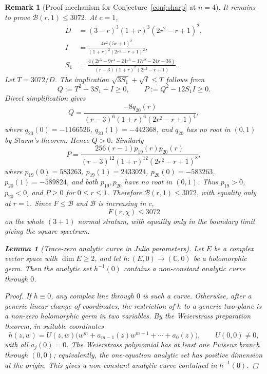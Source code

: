 \documentclass[11pt]{article}
\newtheorem{lemma}[theorem]{Lemma}
\newtheorem{remark}[theorem]{Remark}
\numberwithin{equation}{section}
\newcommand{\bbC}{\mathbb C}
\begin{document}
\begin{remark}[Proof mechanism for Conjecture~\ref{conj:sharp} at $n=4$]
It remains to prove $\mathcal B(r,1)\le3072$.  At $c=1$,
\[
\begin{aligned}
  D&=(3-r)^3(1+r)^3(2r^2-r+1)^2,\\
  I&=\frac{4r^2(5r+1)^2}{(1+r)^2(2r^2-r+1)^2},\\
  S_1&=\frac{4(2r^5-9r^4-24r^3-17r^2-24r-36)}
  {(r-3)(1+r)^2(2r^2-r+1)} .
\end{aligned}
\]
Let $T=3072/D$.  The implication
$\sqrt{3S_1}+\sqrt I\le T$ follows from
\[
  Q:=T^2-3S_1-I\ge0,\qquad
  P:=Q^2-12S_1I\ge0 .
\]
Direct simplification gives
\[
  Q=\frac{-8q_{20}(r)}
  {(r-3)^6(1+r)^6(2r^2-r+1)^4},
\]
where $q_{20}(0)=-1166526$, $q_{20}(1)=-442368$, and
$q_{20}$ has no root in $(0,1)$ by Sturm's theorem.  Hence $Q>0$.  Similarly
\[
  P=\frac{256(r-1)p_{19}(r)p_{20}(r)}
  {(r-3)^{12}(1+r)^{12}(2r^2-r+1)^8},
\]
where $p_{19}(0)=583263$, $p_{19}(1)=2433024$,
$p_{20}(0)=-583263$, $p_{20}(1)=-589824$, and both $p_{19},p_{20}$
have no root in $(0,1)$.  Thus $p_{19}>0$, $p_{20}<0$, and $P\ge0$ for
$0\le r\le1$.  Therefore $\mathcal B(r,1)\le3072$, with equality only at
$r=1$.  Since $F\le\mathcal B$ and $\mathcal B$ is increasing in $c$,
\[
  F(r,\chi)\le3072
\]
on the whole $(3{+}1)$ normal stratum, with equality only in the boundary
limit giving the square spectrum.

\smallskip

\begin{lemma}[Trace-zero analytic curve in Julia parameters]\label{lem:trace-zero-julia-curve}
Let \(E\) be a complex vector space with \(\dim E\ge2\), and let
\(h:(E,0)\to(\bbC,0)\) be a holomorphic germ.  Then the analytic set
\(h^{-1}(0)\) contains a non-constant analytic curve through \(0\).
\end{lemma}

\begin{proof}
If \(h\equiv0\), any complex line through \(0\) is such a curve.  Otherwise,
after a generic linear change of coordinates, the restriction of \(h\) to a
generic two-plane is a non-zero holomorphic germ in two variables.  By the
Weierstrass preparation theorem, in suitable coordinates
\[
  h(z,w)=U(z,w)\bigl(w^m+a_{m-1}(z)w^{m-1}+\cdots+a_0(z)\bigr),
  \qquad U(0,0)\ne0,
\]
with all \(a_j(0)=0\).  The Weierstrass polynomial has at least one Puiseux
branch through \((0,0)\); equivalently, the one-equation analytic set has
positive dimension at the origin.  This gives a non-constant analytic curve
contained in \(h^{-1}(0)\).
\end{proof}



\end{remark}
\end{document}

